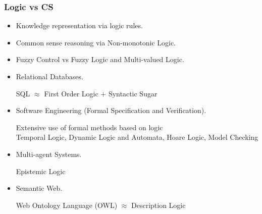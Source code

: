 \documentclass[UTF8,aspectratio=43,11pt,colorlinks,compress,openany]{beamer}%
\begin{document}
\begin{frame}\frametitle{Logic vs CS}
	\begin{itemize}
		\item Knowledge representation via logic rules.
		\item Common sense reasoning via Non-monotonic Logic.
		\item Fuzzy Control vs Fuzzy Logic and Multi-valued Logic.
		\item Relational Databases.
		
		SQL $\approx$ First Order Logic $+$ Syntactic Sugar
		\item Software Engineering (Formal Specification and Verification).
		
		Extensive use of formal methods based on logic\\
		Temporal Logic, Dynamic Logic and Automata, Hoare Logic, Model Checking
		\item Multi-agent Systems.
		
		Epistemic Logic
		\item Semantic Web.
		
		Web Ontology Language (OWL) $\approx$ Description Logic
	\end{itemize}
\end{frame}
\end{document}
